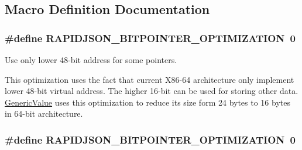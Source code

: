 \subsection{Macro Definition Documentation}
\subsubsection[{\texorpdfstring{R\+A\+P\+I\+D\+J\+S\+O\+N\+\_\+48\+B\+I\+T\+P\+O\+I\+N\+T\+E\+R\+\_\+\+O\+P\+T\+I\+M\+I\+Z\+A\+T\+I\+ON}{RAPIDJSON_48BITPOINTER_OPTIMIZATION}}]{\setlength{\rightskip}{0pt plus 5cm}\#define R\+A\+P\+I\+D\+J\+S\+O\+N\+\_\+B\+I\+T\+P\+O\+I\+N\+T\+E\+R\+\_\+\+O\+P\+T\+I\+M\+I\+Z\+A\+T\+I\+ON~0}\hypertarget{group___r_a_p_i_d_j_s_o_n___c_o_n_f_i_g_ga93fb983f78208d12c822376e1ea6d185}{}\label{group___r_a_p_i_d_j_s_o_n___c_o_n_f_i_g_ga93fb983f78208d12c822376e1ea6d185}


Use only lower 48-\/bit address for some pointers. 

This optimization uses the fact that current X86-\/64 architecture only implement lower 48-\/bit virtual address. The higher 16-\/bit can be used for storing other data. {\ttfamily \hyperlink{class_generic_value}{Generic\+Value}} uses this optimization to reduce its size form 24 bytes to 16 bytes in 64-\/bit architecture. 
\subsubsection[{\texorpdfstring{R\+A\+P\+I\+D\+J\+S\+O\+N\+\_\+48\+B\+I\+T\+P\+O\+I\+N\+T\+E\+R\+\_\+\+O\+P\+T\+I\+M\+I\+Z\+A\+T\+I\+ON}{RAPIDJSON_48BITPOINTER_OPTIMIZATION}}]{\setlength{\rightskip}{0pt plus 5cm}\#define R\+A\+P\+I\+D\+J\+S\+O\+N\+\_\+B\+I\+T\+P\+O\+I\+N\+T\+E\+R\+\_\+\+O\+P\+T\+I\+M\+I\+Z\+A\+T\+I\+ON~0}\hypertarget{group___r_a_p_i_d_j_s_o_n___c_o_n_f_i_g_ga93fb983f78208d12c822376e1ea6d185}{}\label{group___r_a_p_i_d_j_s_o_n___c_o_n_f_i_g_ga93fb983f78208d12c822376e1ea6d185}



